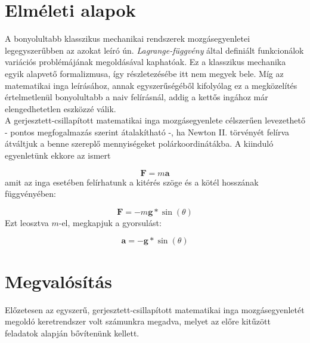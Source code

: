 \begin{multicols}{2}
\section{Elméleti alapok} \label{sec:2}
A bonyolultabb klasszikus mechanikai rendszerek mozgásegyenletei legegyszerűbben az azokat leíró ún. \emph{Lagrange-függvény} által definiált funkcionálok variációs problémájának megoldásával kaphatóak\cite{gyorgyigeza}. Ez a klasszikus mechanika egyik alapvető formalizmusa, így részletezésébe itt nem megyek bele. Míg az matematikai inga leírásához, annak egyszerűségéből kifolyólag ez a megközelítés értelmetlenül bonyolultabb a naiv felírásnál, addig a kettős ingához már elengedhetetlen eszközzé válik. \\
A gerjesztett-csillapított matematikai inga mozgásegyenlete célszerűen levezethető - pontos megfogalmazás szerint átalakítható -, ha Newton II. törvényét felírva átváltjuk a benne szereplő mennyiségeket polárkoordinátákba. A kiinduló egyenletünk ekkore az ismert

\begin{equation}
    \boldsymbol{F} = m \boldsymbol{a}
\end{equation}
amit az inga esetében felírhatunk a kitérés szöge és a kötél hosszának függvényében:

\begin{equation}
    \boldsymbol{F} = -m \boldsymbol{g} * \sin{\left( \theta \right)}
\end{equation}
Ezt leosztva $m$-el, megkapjuk a gyorsulást:

\begin{equation}
    \boldsymbol{a} = -\boldsymbol{g} * \sin{\left( \theta \right)}
\end{equation}

\section{Megvalósítás} \label{sec:3}
Előzetesen az egyszerű, gerjesztett-csillapított matematikai inga mozgásegyenletét megoldó keretrendszer volt számunkra megadva, melyet az előre kitűzött feladatok alapján bővítenünk kellett. 

\end{multicols}